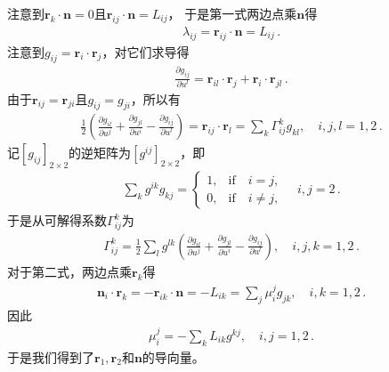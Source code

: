 注意到$\bm r_k\cdot\bm n=0$且$\bm r_{ij}\cdot\bm n=L_{ij}$，
于是第一式两边点乘$\bm n$得
\begin{align}\label{eq:03ex01.28}
    \lambda_{ij}=\bm r_{ij}\cdot\bm n=L_{ij}\, .
\end{align}
注意到$g_{ij}=\bm r_i\cdot\bm r_j$，对它们求导得
\begin{align}\label{eq:03ex01.29}
    \frac{\partial g_{ij}}{\partial u^l}=\bm r_{il}\cdot\bm r_{j}+\bm r_{i}\cdot\bm r_{jl}\, .
\end{align}
由于$\bm r_{ij}=\bm r_{ji}$且$g_{ij}=g_{ji}$，所以有
\begin{align}\label{eq:03ex01.30}
    \frac{1}{2}\left(\frac{\partial g_{il}}{\partial u^j}+\frac{\partial g_{jl}}{\partial u^i}-\frac{\partial g_{ij}}{\partial u^l}\right)=\bm r_{ij}\cdot\bm r_l=\sum\limits_{k}{\varGamma_{ij}^k g_{kl}}, \quad i,j,l=1,2\, .
\end{align}
记$[g_{ij}]_{2\times2}$的逆矩阵为$[g^{ij}]_{2\times2}$，即
\begin{align}\label{eq:03ex01.31}
    \sum\limits_{k}{g^{ik}g_{kj}}=\left\{\begin{array}{ll}
        1, & \text{if}\quad i=j,     \\
        0, & \text{if}\quad i\neq j,
    \end{array}\right.\quad i,j=2\, .
\end{align}
于是从可解得系数$\varGamma_{ij}^k$为
\begin{align}\label{eq:03ex01.32}
    \varGamma_{ij}^k=\frac{1}{2}\sum\limits_{l}{g^{lk}\left(\frac{\partial g_{il}}{\partial u^j}+\frac{\partial g_{jl}}{\partial u^i}-\frac{\partial g_{ij}}{\partial u^l}\right)},\quad i,j,k=1,2\, .
\end{align}
对于第二式，两边点乘$\bm r_k$得
\begin{align}\label{eq:03ex01.33}
    \bm n_i\cdot\bm r_k=-\bm r_{ik}\cdot\bm n=-L_{ik}=\sum\limits_{j}{\mu_i^j g_{jk}}, \quad i,k=1,2\, .
\end{align}
因此
\begin{align}\label{eq:03ex01.34}
    \mu_i^j=-\sum\limits_{k}{L_{ik}g^{kj}},\quad i,j=1,2\, .
\end{align}
于是我们得到了$\bm r_1,\bm r_2$和$\bm n$的导向量。
